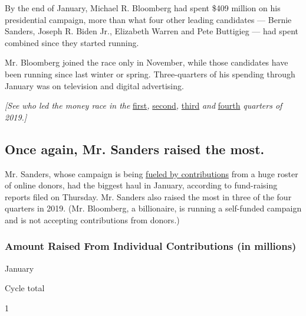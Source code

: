 By the end of January, Michael R. Bloomberg had spent \$409 million on
his presidential campaign, more than what four other leading candidates
--- Bernie Sanders, Joseph R. Biden Jr., Elizabeth Warren and Pete
Buttigieg --- had spent combined since they started running.

Mr. Bloomberg joined the race only in November, while those candidates
have been running since last winter or spring. Three-quarters of his
spending through January was on television and digital advertising.

\emph{{[}See who led the money race in the}
\href{https://www.nytimes.com/interactive/2019/us/politics/campaign-finance-2020-fundraising.html}{first}\emph{,}
\href{https://www.nytimes.com/interactive/2019/07/16/us/politics/democratic-fundraising-2020.html}{second}\emph{,}
\href{https://www.nytimes.com/interactive/2019/10/16/us/elections/democratic-q3-fundraising.html}{third}
\emph{and}
\href{https://www.nytimes.com/interactive/2020/02/01/us/elections/democratic-q4-fundraising.html}{fourth}
\emph{quarters of 2019.{]}}

\hypertarget{once-again-mr-sanders-raised-the-most}{%
\subsection{Once again, Mr. Sanders raised the
most.}\label{once-again-mr-sanders-raised-the-most}}

Mr. Sanders, whose campaign is being
\href{https://www.nytimes.com/interactive/2020/02/01/us/politics/democratic-presidential-campaign-donors.html?action=click\&module=Top\%20Stories\&pgtype=Homepage}{fueled
by contributions} from a huge roster of online donors, had the biggest
haul in January, according to fund-raising reports filed on Thursday.
Mr. Sanders also raised the most in three of the four quarters in 2019.
(Mr. Bloomberg, a billionaire, is running a self-funded campaign and is
not accepting contributions from donors.)

\hypertarget{amount-raised-from-individual-contributions-in-millions}{%
\subsubsection{Amount Raised From Individual Contributions (in
millions)}\label{amount-raised-from-individual-contributions-in-millions}}

January

Cycle total

1

